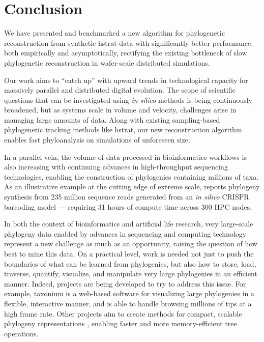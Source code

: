 \section{Conclusion} \label{sec:conclusion}

We have presented and benchmarked a new algorithm for phylogenetic reconstruction from synthetic hstrat \citep{moreno2024hstrat} data with significantly better performance, both empirically and asymptotically, rectifying the existing bottleneck of slow phylogenetic reconstruction in wafer-scale distributed simulations.

Our work aims to ``catch up'' with upward trends in technological capacity for massively parallel and distributed digital evolution.
The scope of scientific questions that can be investigated using \textit{in silico} methods is being continuously broadened, but as systems scale in volume and velocity, challenges arise in managing large amounts of data.
Along with existing sampling-based phylogenetic tracking methods like hstrat, our new reconstruction algorithm enables fast phyloanalysis on simulations of unforeseen size.

In a parallel vein, the volume of data processed in bioinformatics workflows is also increasing with continuing advances in high-throughput sequencing technologies, enabling the construction of phylogenies containing millions of taxa.
As an illustrative example at the cutting edge of extreme scale, \citet{konno2022deep} reports phylogeny synthesis from 235 million sequence reads generated from an \textit{in silico} CRISPR barcoding model --- requiring 31 hours of compute time across 300 HPC nodes.

In both the context of bioinformatics and artificial life research, very large-scale phylogeny data enabled by advances in sequencing and computing technology represent a new challenge as much as an opportunity, raising the question of how best to mine this data.
On a practical level, work is needed not just to push the boundaries of what can be learned from phylogenies, but also how to store, load, traverse, quantify, visualize, and manipulate very large phylogenies in an efficient manner.
Indeed, projects are being developed to try to address this issue.
For example, taxonium \citep{sanderson2022taxonium} is a web-based software for visualizing large phylogenies in a flexible, interactive manner, and is able to handle browsing millions of tips at a high frame rate.
Other projects aim to create methods for compact, scalable phylogeny representations \citep{moshiri2025compacttree, moshiri2020treeswift}, enabling faster and more memory-efficient tree operations.

